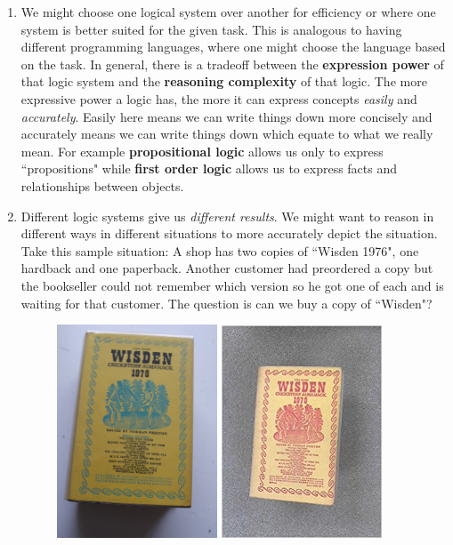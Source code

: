 \documentclass{article}
\begin{document}
\begin{enumerate}
\item We might choose one logical system over another for efficiency or where one system is better suited for the given task. This is analogous to having different programming languages, where one might choose the language based on the task. In general, there is a tradeoff between the \textbf{expression power} of that logic system and the \textbf{reasoning complexity} of that logic. The more expressive power a logic has, the more it can express concepts \textit{easily} and \textit{accurately}. Easily here means we can write things down more concisely and accurately means we can write things down which equate to what we really mean. For example \textbf{propositional logic} allows us only to express ``propositions" while \textbf{first order logic} allows us to express facts and relationships between objects.
\item Different logic systems give us \textit{different results}. We might want to reason in different ways in different situations to more accurately depict the situation. Take this sample situation: A shop has two copies of ``Wisden 1976", one hardback and one paperback. Another customer had preordered a copy but the bookseller could not remember which version so he got one of each and is waiting for that customer. The question is can we buy a copy of ``Wisden"?
\begin{figure}[H]
\centering
\includegraphics[width=0.45\textwidth, keepaspectratio]{imgs/wisden.jpg}
\includegraphics[width=0.45\textwidth, keepaspectratio]{imgs/wisden-paper.jpg}

\end{figure}
\end{enumerate}
\end{document}
